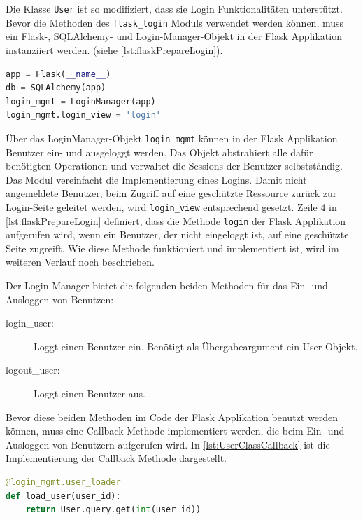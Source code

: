 \documentclass[a4paper,titlepage,halfparskip,12pt]{scrreprt}
\begin{document}
\begin{onehalfspacing}
Die Klasse \texttt{User} ist so modifiziert, dass sie Login Funktionalitäten unterstützt. Bevor die Methoden des \texttt{flask\_login} Moduls verwendet werden können, muss ein Flask-, SQLAlchemy- und Login-Manager-Objekt in der Flask Applikation instanziiert werden. (siehe \autoref{lst:flaskPrepareLogin}).

\begin{lstlisting}[language=python, caption={Vorbereitungen der Login Funktionalität in der Flask Applikation}, label={lst:flaskPrepareLogin}]
app = Flask(__name__)
db = SQLAlchemy(app)
login_mgmt = LoginManager(app)
login_mgmt.login_view = 'login'
\end{lstlisting}

Über das LoginManager-Objekt \texttt{login\_mgmt} können in der Flask Applikation Benutzer ein- und ausgeloggt werden. Das Objekt abstrahiert alle dafür benötigten Operationen und verwaltet die Sessions der Benutzer selbstständig. Das Modul vereinfacht die Implementierung eines Logins. Damit nicht angemeldete Benutzer, beim Zugriff auf eine geschützte Ressource zurück zur Login-Seite geleitet werden, wird \texttt{login\_view} entsprechend gesetzt. Zeile 4 in \autoref{lst:flaskPrepareLogin} definiert, dass die Methode \texttt{login} der Flask Applikation aufgerufen wird, wenn ein Benutzer, der nicht eingeloggt ist, auf eine geschützte Seite zugreift. Wie diese Methode funktioniert und implementiert ist, wird im weiteren Verlauf noch beschrieben.\cite{flaskLogin}

Der Login-Manager bietet die folgenden beiden Methoden für das Ein- und Ausloggen von Benutzen:

\begin{description}
\item[login\_user:] Loggt einen Benutzer ein. Benötigt als Übergabeargument ein User-Objekt.
\item[logout\_user:] Loggt einen Benutzer aus.
\end{description}

Bevor diese beiden Methoden im Code der Flask Applikation benutzt werden können, muss eine Callback Methode implementiert werden, die beim Ein- und Ausloggen von Benutzern aufgerufen wird. In \autoref{lst:UserClassCallback} ist die Implementierung der Callback Methode dargestellt.

\begin{lstlisting}[language=python, caption={Callback Methode für das Modul flask\_login}, label={lst:UserClassCallback}]
@login_mgmt.user_loader
def load_user(user_id):
    return User.query.get(int(user_id))
\end{lstlisting}


\end{onehalfspacing}
\end{document}
